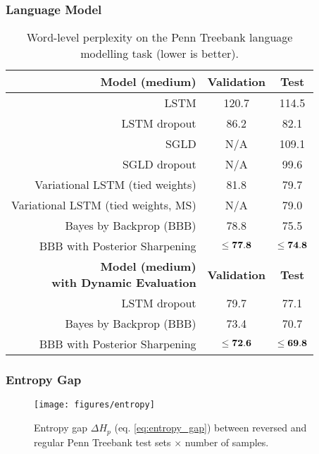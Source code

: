 \begin{frame}
  \frametitle{Language Model}
  \begin{table}
    \caption{Word-level perplexity on the Penn Treebank language modelling task (lower is better).}
    \label{tab:ptb}
    \small
    \begin{tabular}{r|c|c}
      \textbf{Model (medium)}             & \textbf{Validation} & \textbf{Test} \\ 
      \hline
      LSTM & 120.7 & 114.5\\
      LSTM dropout                        & 	86.2	        &	82.1 \\
      SGLD    	                        &	N/A				&	109.1		\\
      SGLD dropout	                    &	N/A				&	99.6		\\
      Variational LSTM (tied weights)     &	81.8        	&	79.7 \\
      Variational LSTM (tied weights, MS)	&	N/A		        &	79.0		\\
      Bayes by Backprop (BBB)       	        & 	78.8	        &	 75.5		\\
      BBB with Posterior Sharpening            &    {$\bf \leq 77.8$}           &   {$\bf \leq 74.8$}		\\
      
      \hline 
      \shortstack{\textbf{Model (medium)} \\ \textbf{with Dynamic Evaluation}}
                                          & \textbf{Validation} & \textbf{Test} \\
      \hline
      LSTM dropout                      & 	79.7	        &	77.1 \\
      Bayes by Backprop (BBB)   	        & 	73.4	        &	70.7		\\
      BBB with Posterior Sharpening	      &    {$\bf \leq 72.6$}          &   {$\bf \leq 69.8$}		\\
      \hline
    \end{tabular}
  \end{table}
\end{frame}


\begin{frame}
  \frametitle{Entropy Gap}
  \begin{figure}[t]
    \centering
    \texttt{[image: figures/entropy]}
    \caption{Entropy gap $\Delta H_p$ (eq. \eqref{eq:entropy_gap}) between reversed and regular Penn Treebank test sets $\times$ number of samples.}
    \label{fig:uncertainty}
    \vskip -0.2in
  \end{figure}
\end{frame}


